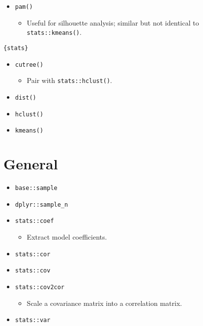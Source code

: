 \documentclass[
]{book}
\providecommand{\tightlist}{%
  \setlength{\itemsep}{0pt}\setlength{\parskip}{0pt}}
\begin{document}
\begin{itemize}
\tightlist
\item
  \texttt{pam()}

  \begin{itemize}
  \tightlist
  \item
    Useful for silhouette analysis; similar but not identical to \texttt{stats::kmeans()}.
  \end{itemize}
\end{itemize}

\texttt{\{stats\}}

\begin{itemize}
\tightlist
\item
  \texttt{cutree()}

  \begin{itemize}
  \tightlist
  \item
    Pair with \texttt{stats::hclust()}.
  \end{itemize}
\item
  \texttt{dist()}
\item
  \texttt{hclust()}
\item
  \texttt{kmeans()}
\end{itemize}

\hypertarget{general}{%
\section{General}\label{general}}

\begin{itemize}
\tightlist
\item
  \texttt{base::sample}
\item
  \texttt{dplyr::sample\_n}
\item
  \texttt{stats::coef}

  \begin{itemize}
  \tightlist
  \item
    Extract model coefficients.
  \end{itemize}
\item
  \texttt{stats::cor}
\item
  \texttt{stats::cov}
\item
  \texttt{stats::cov2cor}

  \begin{itemize}
  \tightlist
  \item
    Scale a covariance matrix into a correlation matrix.
  \end{itemize}
\item
  \texttt{stats::var}
\end{itemize}
\end{document}
